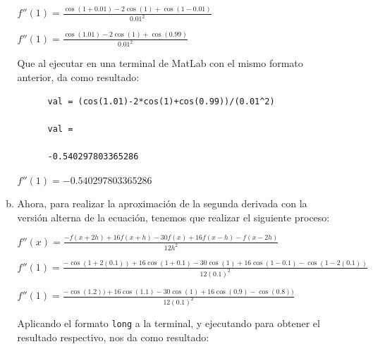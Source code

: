 \documentclass[english,notitlepage,letterpaper, 10pt]{article} %
\begin{document}
\begin{enumerate}
\begin{enumerate}[a)]
\begin{center}
      \begin{math}  
        f''(1) = \displaystyle \frac{\cos(1+0.01)-2\cos(1)+\cos(1-0.01)}{0.01^2}  
      \end{math}  
      
      \begin{math}  
        f''(1) = \displaystyle \frac{\cos(1.01)-2\cos(1)+\cos(0.99)}{0.01^2}  
      \end{math}  
    \end{center}  
    
    Que al ejecutar en una terminal de MatLab con el mismo formato anterior, da como resultado: 
    
    \begin{lstlisting}  
      val = (cos(1.01)-2*cos(1)+cos(0.99))/(0.01^2)   
      
      val = 
      
      -0.540297803365286  
    \end{lstlisting}  
    
    \begin{center}  
      \begin{math}  
        f''(1) =  -0.540297803365286  
      \end{math}  
    \end{center}  
    
    \item Ahora, para realizar la aproximación de la segunda derivada con la versión alterna de la ecuación, tenemos que realizar el siguiente proceso: 
    
    \begin{center}  
      \begin{math}  
        f''(x) = \displaystyle \frac{-f(x+2h)+16f(x+h)-30f(x)+16f(x-h)-f(x-2h)}{12h^2}  
      \end{math}  
      
      \begin{math}  
        f''(1) = \displaystyle \frac{-\cos(1+2(0.1))+16\cos(1+0.1)-30\cos(1)+16\cos(1-0.1)-\cos(1-2(0.1))}{12(0.1)^2} 
      \end{math}  
      
      \begin{math}  
        f''(1) = \displaystyle \frac{-\cos(1.2))+16\cos(1.1)-30\cos(1)+16\cos(0.9)-\cos(0.8))}{12(0.1)^2} 
      \end{math}  
    \end{center}  
    
    Aplicando el formato \texttt{long} a la terminal, y ejecutando para obtener el resultado respectivo, nos da como resultado: 
    

\end{enumerate}
\end{enumerate}
\end{document}
